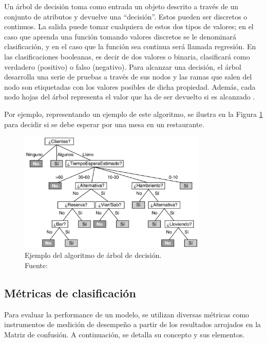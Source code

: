 \begin{itemize}
	Un árbol de decisión toma como entrada un objeto descrito a través de un conjunto de atributos y devuelve una “decisión”. Estos pueden ser discretos o continuos. La salida puede tomar cualquiera de estos dos tipos de valores; en el caso que aprenda una función tomando valores discretos se le denominará clasificación, y en el caso que la función sea continua será llamada regresión. En las clasificaciones booleanas, es decir de dos valores o binaria, clasificará como verdadero (positivo) o falso (negativo). Para alcanzar una decisión, el árbol desarrolla una serie de pruebas a través de sus nodos y las ramas que salen del nodo son etiquetadas con los valores posibles de dicha propiedad. Además, cada nodo hojas del árbol representa el valor que ha de ser devuelto si es alcanzado \parencite{bk_russell2004intart}.
	
	Por ejemplo, representando un ejemplo de este algoritmo, se ilustra en la Figura \ref{2:fig38} para decidir si se debe esperar por una mesa en un restaurante.
	\begin{figure}[h]
		\begin{center}
			\includegraphics[width=0.8\textwidth]{2/figures/arbol_decision.jpg}
			\caption[Ejemplo del algoritmo de árbol de decisión]{Ejemplo del algoritmo de árbol de decisión.\\
			Fuente: \cite{bk_russell2004intart}}
			\label{2:fig38}
		\end{center}
	\end{figure}
\end{itemize}

\clearpage

\subsection{Métricas de clasificación}
Para evaluar la performance de un modelo, se utilizan diversas métricas como instrumentos de medición de desempeño a partir de los resultados arrojados en la Matriz de confusión. A continuación, se detalla su concepto y sus elementos.

